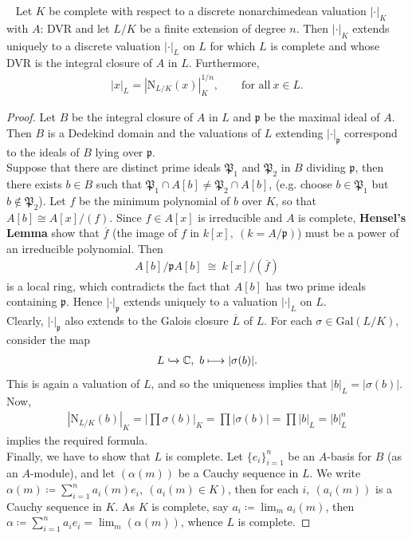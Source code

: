 \documentclass[12pt,a4paper,footinclude=true,headinclude=true]{scrbook} %
\newenvironment{theorem}[2][]
{\renewcommand\theinnercustomthm{#2}\innercustomthm[#1]
\begin{mdframed}[backgroundcolor=yellow!20]\ }
{\end{mdframed}\endinnercustomthm}
\begin{document}
\begin{theorem}{270}
    Let $K$ be complete with respect to a discrete nonarchimedean valuation $|\cdot|_K$ with $A$: DVR and let $L/K$ be a finite extension of degree $n$. Then $|\cdot|_K$ extends uniquely to a discrete valuation $|\cdot|_L$ on $L$ for which $L$ is complete and whose DVR is the integral closure of $A$ in $L$. Furthermore,
    \begin{align*}
        |x|_L=|\mathrm{N}_{L/K}(x)|_K^{1/n},\qquad\text{for all}\ x\in L.
    \end{align*}
\end{theorem}
\begin{proof}
    Let $B$ be the integral closure of $A$ in $L$ and $\mathfrak{p}$ be the maximal ideal of $A$. Then $B$ is a Dedekind domain and the valuations of $L$ extending $|\cdot|_\mathfrak{p}$ correspond to the ideals of $B$ lying over $\mathfrak{p}$.\\
    Suppose that there are distinct prime ideals $\mathfrak{P}_1$ and $\mathfrak{P}_2$ in $B$ dividing $\mathfrak{p}$, then there exists $b\in B$ such that $\mathfrak{P}_1\cap A[b]\neq\mathfrak{P}_2\cap A[b]$, (e.g. choose $b\in\mathfrak{P}_1$ but $b\notin\mathfrak{P}_2$). Let $f$ be the minimum polynomial of $b$ over $K$, so that $A[b]\cong A[x]/(f)$. Since $f\in A[x]$ is irreducible and $A$ is complete, \textbf{Hensel's Lemma} show that $\overline{f}$ (the image of $f$ in $k[x],\ (k=A/\mathfrak{p})$) must be a power of an irreducible polynomial. Then
    \begin{align*}
        A[b]/\mathfrak{p}A[b]\ \cong\ k[x]/(\overline{f})
    \end{align*}
    is a local ring, which contradicts the fact that $A[b]$ has two prime ideals containing $\mathfrak{p}$. Hence $|\cdot|_\mathfrak{p}$ extends uniquely to a valuation $|\cdot|_L$ on $L$.\\
    Clearly, $|\cdot|_\mathfrak{p}$ also extends to the Galois closure $\overline{L}$ of $L$. For each $\sigma\in\mathrm{Gal}(L/K)$, consider the map
    \begin{align*}
        L\xhookrightarrow{} \mathbb{C},\ b\longmapsto|\sigma(b)|.
    \end{align*}
    This is again a valuation of $L$, and so the uniqueness implies that $|b|_L=|\sigma(b)|$. Now,
    \begin{align*}
        |\mathrm{N}_{L/K}(b)|_K=|\prod\sigma(b)|_K=\prod|\sigma(b)|=\prod|b|_L=|b|_L^n
    \end{align*}
    implies the required formula.\\
    Finally, we have to show that $L$ is complete. Let $\{e_i\}_{i=1}^n$ be an $A$-basis for $B$ (as an $A$-module), and let $(\alpha(m))$ be a Cauchy sequence in $L$. We write $\alpha(m)\coloneqq\sum_{i=1}^na_i(m)e_i,\ (a_i(m)\in K)$, then for each $i,\ (a_i(m))$ is a Cauchy sequence in $K$. As $K$ is complete, say $a_i\coloneqq\lim_ma_i(m)$, then $\alpha\coloneqq\sum_{i=1}^na_ie_i=\lim_m(\alpha(m))$, whence $L$ is complete.
\end{proof}
\end{document}
